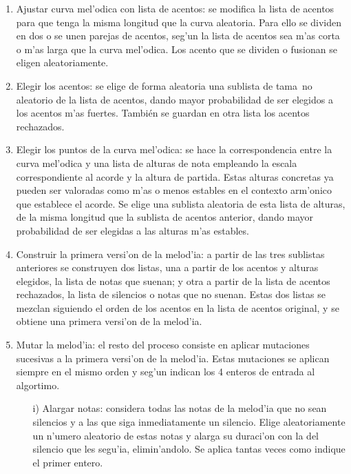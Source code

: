 ﻿\documentclass[a4paper,12pt]{article}
\begin{document}
        \begin{enumerate}
        \item Ajustar curva mel'odica con lista de acentos: se modifica la lista de acentos para que tenga la misma longitud que la curva aleatoria. Para ello se dividen en dos o se unen parejas de acentos, seg'un la lista de acentos sea m'as corta o m'as larga que la curva mel'odica. Los acento que se dividen o fusionan se eligen aleatoriamente.
        \item Elegir los acentos: se elige de forma aleatoria una sublista de tama~no aleatorio de la lista de acentos, dando mayor probabilidad de ser elegidos a los acentos m'as fuertes. También se guardan en otra lista los acentos rechazados.
        \item Elegir los puntos de la curva mel'odica: se hace la correspondencia entre la curva mel'odica y una lista de alturas de nota empleando la escala correspondiente al acorde y la altura de partida. Estas alturas concretas ya pueden ser valoradas como m'as o menos estables en el contexto arm'onico que establece el acorde. Se elige una sublista aleatoria de esta lista de alturas, de la misma longitud que la sublista de acentos anterior, dando mayor probabilidad de ser elegidas a las alturas m'as estables.
        \item Construir la primera versi'on de la melod'ia: a partir de las tres sublistas anteriores se construyen dos listas, una a partir de los acentos y alturas elegidos, la lista de notas que suenan; y otra a partir de la lista de acentos rechazados, la lista de silencios o notas que no suenan. Estas dos listas se mezclan siguiendo el orden de los acentos en la lista de acentos original, y se obtiene una primera versi'on de la melod'ia.
        \item Mutar la melod'ia: el resto del proceso consiste en aplicar mutaciones sucesivas a la primera versi'on de la melod'ia. Estas mutaciones se aplican siempre en el mismo orden y seg'un indican los 4 enteros de entrada al algortimo.
                \begin{enumerate}
                \item[i)] Alargar notas: considera todas las notas de la melod'ia que no sean silencios y a las que siga inmediatamente un silencio. Elige aleatoriamente un n'umero aleatorio de estas notas y alarga su duraci'on con la del silencio que les segu'ia, elimin'andolo. Se aplica tantas veces como indique el primer entero.

\end{enumerate}
\end{enumerate}
\end{document}

